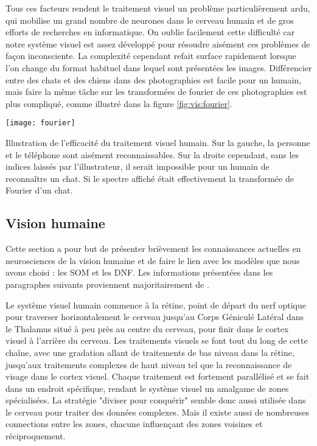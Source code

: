 	Tous ces facteurs rendent le traitement visuel un problème particulièrement ardu, qui mobilise un grand nombre de neurones dans le cerveau humain et de gros efforts de recherches en informatique. On oublie facilement cette difficulté car notre système visuel est assez développé pour résoudre aisément ces problèmes de façon inconsciente. La complexité cependant refait surface rapidement lorsque l'on change du format habituel dans lequel sont présentées les images. Différencier entre des chats et des chiens dans des photographies est facile pour un humain, mais faire la même tâche sur les transformées de fourier de ces photographies est plus compliqué, comme illustré dans la figure \ref{fig:vis:fourier}.

	\begin{figureth}
		\texttt{[image: fourier]}
		\caption[Illustration de l'efficacité du traitement visuel humain.]{Illustration de l'efficacité du traitement visuel humain. Sur la gauche, la personne et le téléphone sont aisément reconnaissables. Sur la droite cependant, sans les indices laissés par l'illustrateur, il serait impossible pour un humain de reconnaître un chat. Si le spectre affiché était effectivement la transformée de Fourier d'un chat.\footnotemark}\label{fig:vis:fourier}
	\end{figureth}


\subsection{Vision humaine}

	Cette section a pour but de présenter brièvement les connaissances actuelles en neurosciences de la vision humaine et de faire le lien avec les modèles que nous avons choisi : les SOM et les DNF. Les informations présentées dans les paragraphes suivants proviennent majoritairement de \cite{gilbert2020constructive}.

	Le système visuel humain commence à la rétine, point de départ du nerf optique pour traverser horizontalement le cerveau jusqu'au Corps Géniculé Latéral dans le Thalamus situé à peu près au centre du cerveau, pour finir dans le cortex visuel à l'arrière du cerveau. Les traitements visuels se font tout du long de cette chaîne, avec une gradation allant de traitements de bas niveau dans la rétine, jusqu'aux traitements complexes de haut niveau tel que la reconnaissance de visage dans le cortex visuel. Chaque traitement est fortement parallélisé et se fait dans un endroit spécifique, rendant le système visuel un amalgame de zones spécialisées. La stratégie "diviser pour conquérir" semble donc aussi utilisée dans le cerveau pour traiter des données complexes. Mais il existe aussi de nombreuses connections entre les zones, chacune influençant des zones voisines et réciproquement.

